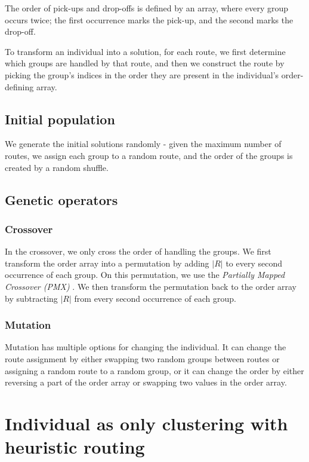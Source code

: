 The order of pick-ups and drop-offs is defined by an array, where every group occurs twice; the first occurrence marks the pick-up, and the second marks the drop-off.

To transform an individual into a solution, for each route, we first determine which groups are handled by that route, and then we construct the route by picking the group's indices in the order they are present in the individual's order-defining array.

\subsection{Initial population}

We generate the initial solutions randomly - given the maximum number of routes, we assign each group to a random route, and the order of the groups is created by a random shuffle.

\subsection{Genetic operators}

\subsubsection{Crossover}

In the crossover, we only cross the order of handling the groups. We first transform the order array into a permutation by adding $|R|$ to every second occurrence of each group. On this permutation, we use the \textit{Partially Mapped Crossover (PMX)} \cite{Goldberg1985AllelesLA}. We then transform the permutation back to the order array by subtracting $|R|$ from every second occurrence of each group.

\subsubsection{Mutation}

Mutation has multiple options for changing the individual. It can change the route assignment by either swapping two random groups between routes or assigning a random route to a random group, or it can change the order by either reversing a part of the order array or swapping two values in the order array.

\section{Individual as only clustering with heuristic routing}\label{sec:evoh}

